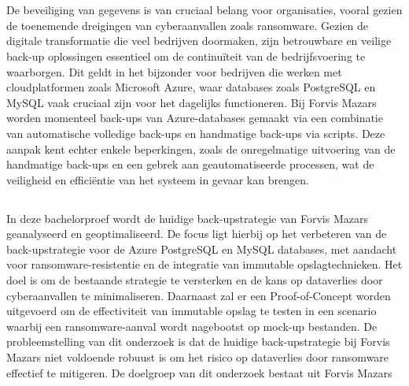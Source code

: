 
\chapter{}%
\label{ch:inleiding}

De beveiliging van gegevens is van cruciaal belang voor organisaties, vooral gezien de toenemende dreigingen van cyberaanvallen zoals ransomware. Gezien de digitale transformatie die veel bedrijven doormaken, zijn betrouwbare en veilige back-up oplossingen essentieel om de continuïteit van de bedrijfsvoering te waarborgen. Dit geldt in het bijzonder voor bedrijven die werken met cloudplatformen zoals Microsoft Azure, waar databases zoals PostgreSQL en MySQL vaak cruciaal zijn voor het dagelijks functioneren. Bij Forvis Mazars worden momenteel back-ups van Azure-databases gemaakt via een combinatie van automatische volledige back-ups en handmatige back-ups via scripts. Deze aanpak kent echter enkele beperkingen, zoals de onregelmatige uitvoering van de handmatige back-ups en een gebrek aan geautomatiseerde processen, wat de veiligheid en efficiëntie van het systeem in gevaar kan brengen.



\section{}%
\label{sec:probleemstelling}
In deze bachelorproef wordt de huidige back-upstrategie van Forvis Mazars geanalyseerd en geoptimaliseerd. De focus ligt hierbij op het verbeteren van de back-upstrategie voor de Azure PostgreSQL en MySQL databases, met aandacht voor ransomware-resistentie en de integratie van immutable opslagtechnieken. Het doel is om de bestaande strategie te versterken en de kans op dataverlies door cyberaanvallen te minimaliseren. Daarnaast zal er een Proof-of-Concept worden uitgevoerd om de effectiviteit van immutable opslag te testen in een scenario waarbij een ransomware-aanval wordt nagebootst op mock-up bestanden. De probleemstelling van dit onderzoek is dat de huidige back-upstrategie bij Forvis Mazars niet voldoende robuust is om het risico op dataverlies door ransomware effectief te mitigeren. De doelgroep van dit onderzoek bestaat uit Forvis Mazars

